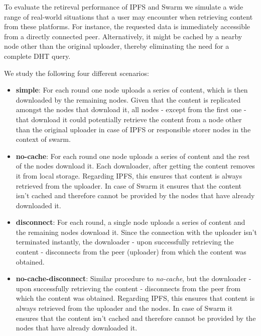 To evaluate the retireval performance of IPFS and Swarm we simulate a wide range of real-world situations that a user may encounter when retrieving content from these platforms. For instance, the requested data is immediately accessible from a directly connected peer. Alternatively, it might be cached by a nearby node other than the original uploader, thereby eliminating the need for a complete DHT query. 

We study the following four different scenarios:

\begin{itemize}[itemsep=0pt]
    \item  \textbf{simple}: For each round one node uploads a series of content, which is then downloaded by the remaining nodes. Given that the content is replicated amongst the nodes that download it, all nodes - except from the first one - that download it could potentially retrieve the content from a node other than the original uploader in case of IPFS or responsible storer nodes in the context of swarm.
    \item \textbf{no-cache}: For each round one node uploads a series of content and the rest of the nodes download it. Each downloader, after getting the content removes it from local storage. Regarding IPFS, this ensures that content is always retrieved from the uploader. In case of Swarm it ensures that the content isn't cached and therefore cannot be provided by the nodes that have already downloaded it.
    \item  \textbf{disconnect}: For each round, a single node uploads a series of content and the remaining nodes download it. Since the connection with the uploader isn't terminated instantly, the downloader - upon successfully retrieving the content - disconnects from the peer (uploader) from which the content was obtained. 
    \item \textbf{no-cache-disconnect}: Similar procedure to \textit{no-cache}, but the downloader - upon successfully retrieving the content - disconnects from the peer from which the content was obtained. Regarding IPFS, this ensures that content is always retrieved from the uploader and the nodes. In case of Swarm it ensures that the content isn't cached and therefore cannot be provided by the nodes that have already downloaded it.
\end{itemize}

